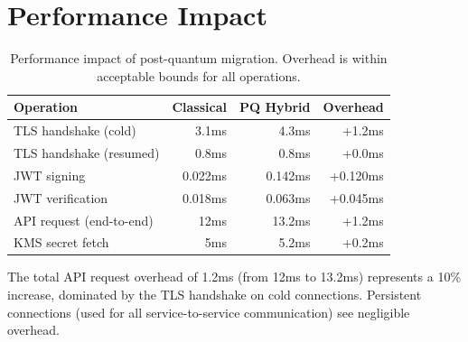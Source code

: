 \section{Performance Impact}

\label{sec:performance}

\begin{table}[H]
\centering
\small
\begin{tabular}{lrrr}
\toprule
\textbf{Operation} & \textbf{Classical} & \textbf{PQ Hybrid} & \textbf{Overhead} \\
\midrule
TLS handshake (cold) & 3.1ms & 4.3ms & +1.2ms \\
TLS handshake (resumed) & 0.8ms & 0.8ms & +0.0ms \\
JWT signing & 0.022ms & 0.142ms & +0.120ms \\
JWT verification & 0.018ms & 0.063ms & +0.045ms \\
API request (end-to-end) & 12ms & 13.2ms & +1.2ms \\
KMS secret fetch & 5ms & 5.2ms & +0.2ms \\
\bottomrule
\end{tabular}
\caption{Performance impact of post-quantum migration. Overhead is within
acceptable bounds for all operations.}
\label{tab:perf}
\end{table}

The total API request overhead of 1.2ms (from 12ms to 13.2ms) represents a
10\% increase, dominated by the TLS handshake on cold connections. Persistent
connections (used for all service-to-service communication) see negligible
overhead.

